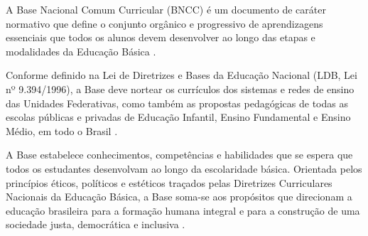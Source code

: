 A Base Nacional Comum Curricular (BNCC) é um documento de caráter normativo que define o conjunto orgânico e progressivo de aprendizagens essenciais que todos os alunos devem desenvolver ao longo das etapas e modalidades da Educação Básica \cite{bncc}.


Conforme definido na Lei de Diretrizes e Bases da Educação Nacional (LDB, Lei nº 9.394/1996), a Base deve nortear os currículos dos sistemas e redes de ensino das Unidades Federativas, como também as propostas pedagógicas de todas as escolas públicas e privadas de Educação Infantil, Ensino Fundamental e Ensino Médio, em todo o Brasil \cite{bncc}.

A Base estabelece conhecimentos, competências e habilidades que se espera que todos os estudantes desenvolvam ao longo da escolaridade básica. Orientada pelos princípios éticos, políticos e estéticos traçados pelas Diretrizes Curriculares Nacionais da Educação Básica, a Base soma-se aos propósitos que direcionam a educação brasileira para a formação humana integral e para a construção de uma sociedade justa, democrática e inclusiva \cite{bncc}.












